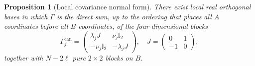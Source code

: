 \documentclass[prx,twocolumn,superscriptaddress,aps,10pt, frontmatterverbose, reprint,footinbib,longbibliography=true]{revtex4-2}
\newtheorem{proposition}{Proposition}
\begin{document}
\begin{proposition}[Local covariance normal form]
\label{prop:covariance-normal-form}
There exist local real orthogonal bases in which $\Gamma$ is the direct sum, up to the ordering that places all $A$ coordinates before all $B$ coordinates, of the four-dimensional blocks
\begin{equation}
    \Gamma^{\mathrm{can}}_j=\begin{pmatrix}\lambda_jJ& \nu_j\mathbb{I}_2\\ -\nu_j\mathbb{I}_2&-\lambda_jJ\end{pmatrix},
    \quad J=\begin{pmatrix}0&1\\-1&0\end{pmatrix},
    \label{eq:canonical-covariance-block}
\end{equation}
together with $N-2\ell$ pure $2\times 2$ blocks on $B$.
\end{proposition}
\end{document}

